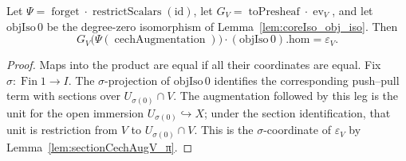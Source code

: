 \begin{lemma}\leanok
  \label{lem:mappedSectionCechAugV_eq}
  Let \(\Psi=\operatorname{forget}\cdot\operatorname{restrictScalars}(\mathrm{id})\), let
  \(G_V=\operatorname{toPresheaf}\cdot\operatorname{ev}_V\), and let
  \(\mathrm{objIso}\,0\) be the degree-zero isomorphism of
  Lemma~\ref{lem:coreIso_obj_iso}. Then
  \[
    G_V\bigl(\Psi(\operatorname{cechAugmentation})\bigr)
      \cdot (\mathrm{objIso}\,0).\mathrm{hom}=\varepsilon_V.
  \]
\end{lemma}
\begin{proof}
  \leanok
  Maps into the product are equal if all their coordinates are equal. Fix
  \(\sigma:\operatorname{Fin}1\to I\). The \(\sigma\)-projection of
  \(\mathrm{objIso}\,0\) identifies the corresponding push--pull term with sections over
  \(U_{\sigma(0)}\cap V\). The augmentation followed by this leg is the unit for the open
  immersion \(U_{\sigma(0)}\hookrightarrow X\); under the section identification, that unit is
  restriction from \(V\) to \(U_{\sigma(0)}\cap V\). This is the \(\sigma\)-coordinate of
  \(\varepsilon_V\) by Lemma~\ref{lem:sectionCechAugV_π}.
\end{proof}

